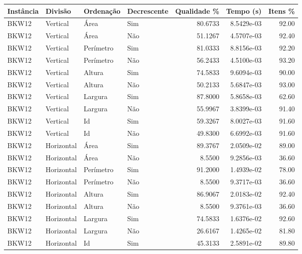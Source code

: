 \begin{tabular}{llllrrr}
\hline
Instância & Divisão     & Ordenação & Decrescente & Qualidade \% & Tempo (s)  & Itens \% \\
\hline
BKW12     & Vertical    & Área      & Sim         & 80.6733      & 8.5429e-03 & 92.00    \\
BKW12     & Vertical    & Área      & Não         & 51.1267      & 4.5707e-03 & 92.40    \\
BKW12     & Vertical    & Perímetro & Sim         & 81.0333      & 8.8156e-03 & 92.20    \\
BKW12     & Vertical    & Perímetro & Não         & 56.2433      & 4.5100e-03 & 93.20    \\
BKW12     & Vertical    & Altura    & Sim         & 74.5833      & 9.6094e-03 & 90.00    \\
BKW12     & Vertical    & Altura    & Não         & 50.2133      & 5.6847e-03 & 93.00    \\
BKW12     & Vertical    & Largura   & Sim         & 87.8000      & 5.8658e-03 & 62.60    \\
BKW12     & Vertical    & Largura   & Não         & 55.9967      & 3.8399e-03 & 91.40    \\
BKW12     & Vertical    & Id        & Sim         & 59.3267      & 8.0027e-03 & 91.60    \\
BKW12     & Vertical    & Id        & Não         & 49.8300      & 6.6992e-03 & 91.60    \\
BKW12     & Horizontal  & Área      & Sim         & 89.3767      & 2.0509e-02 & 89.00    \\
BKW12     & Horizontal  & Área      & Não         & 8.5500       & 9.2856e-03 & 36.60    \\
BKW12     & Horizontal  & Perímetro & Sim         & 91.2000      & 1.4939e-02 & 78.00    \\
BKW12     & Horizontal  & Perímetro & Não         & 8.5500       & 9.3717e-03 & 36.60    \\
BKW12     & Horizontal  & Altura    & Sim         & 86.9067      & 2.0183e-02 & 92.40    \\
BKW12     & Horizontal  & Altura    & Não         & 8.5500       & 9.3761e-03 & 36.60    \\
BKW12     & Horizontal  & Largura   & Sim         & 74.5833      & 1.6376e-02 & 92.60    \\
BKW12     & Horizontal  & Largura   & Não         & 26.6167      & 1.4265e-02 & 81.80    \\
BKW12     & Horizontal  & Id        & Sim         & 45.3133      & 2.5891e-02 & 89.80    \\

\end{tabular}
